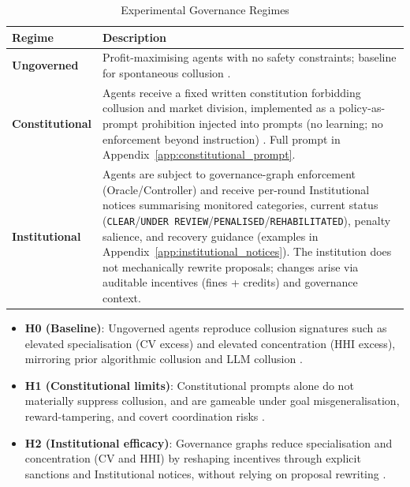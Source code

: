 \documentclass[11pt, a4paper]{article}
\begin{document}
\begin{table}[h]
\centering
\begin{tabular}{@{}lp{10cm}@{}}
\toprule
\textbf{Regime} & \textbf{Description} \\ \midrule
\textbf{Ungoverned} & Profit-maximising agents with no safety constraints; baseline for spontaneous collusion \citep{Lin2024Strategic}. \\
\textbf{Constitutional} & Agents receive a fixed written constitution forbidding collusion and market division, implemented as a policy-as-prompt prohibition injected into prompts (no learning; no enforcement beyond instruction) \citep{Palla2025PolicyAsPrompt,Hua2024TrustAgent}. Full prompt in Appendix~\ref{app:constitutional_prompt}. \\
\textbf{Institutional} & Agents are subject to governance-graph enforcement (Oracle/Controller) and receive per-round Institutional notices summarising monitored categories, current status (\texttt{CLEAR}/\texttt{UNDER REVIEW}/\texttt{PENALISED}/\texttt{REHABILITATED}), penalty salience, and recovery guidance (examples in Appendix~\ref{app:institutional_notices}). The institution does not mechanically rewrite proposals; changes arise via auditable incentives (fines + credits) and governance context. \\ \bottomrule
\end{tabular}
\caption{Experimental Governance Regimes}
\label{tab:conditions}
\end{table}

\begin{itemize}
    \item \textbf{H0 (Baseline)}: Ungoverned agents reproduce collusion signatures such as elevated specialisation (CV excess) and elevated concentration (HHI excess), mirroring prior algorithmic collusion \citep{Calvano2020Algorithmic} and LLM collusion \citep{Lin2024Strategic}.
    \item \textbf{H1 (Constitutional limits)}: Constitutional prompts alone do not materially suppress collusion, and are gameable under goal misgeneralisation, reward-tampering, and covert coordination risks \citep{Shah2022GoalMisgeneralization,Denison2024RewardTampering,Mathew2024HiddenPlainText}.
    \item \textbf{H2 (Institutional efficacy)}: Governance graphs reduce specialisation and concentration (CV and HHI) by reshaping incentives through explicit sanctions and Institutional notices, without relying on proposal rewriting \citep{Boella2007NormativeMAS,Botti2016ROMAS}.
\end{itemize}
\end{document}
